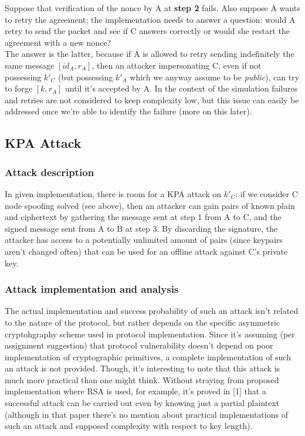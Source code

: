 \documentclass[a4paper,12pt,titlepage]{article}
\begin{document}
Suppose that verification of the nonce by A at \textbf{step 2} fails. Also
suppose A wants to retry the agreement; the implementation needs to answer a
question: would A retry to send the packet and see if C answers correctly or
would she restart the agreement with a new nonce? \\
The answer is the latter, because if A is allowed to retry sending indefinitely
the same message $[id_A, r_A]$, then an attacker impersonating C, even if not
possessing $k'_C$ (but possessing $k'_A$ which we anyway assume to be
\emph{public}), can try to forge $[k, r_A]$ until it's accepted by A.
In the context of the simulation failures and retries are not considered to
keep complexity low, but this issue can easily be addressed once we're able to
identify the failure (more on this later).

\subsection{KPA Attack}
\subsubsection*{Attack description}
In given implementation, there is room for a KPA attack on $k'_C$: if we
consider C node spoofing solved (see above), then an attacker can
gain pairs of known plain and ciphertext by gathering the message sent at step
1 from A to C, and the signed message sent from A to B at step 3. By discarding
the signature, the attacker has access to a potentially unlimited amount of
pairs (since keypairs aren't changed often) that can be used for an offline
attack against C's private key.

\subsubsection*{Attack implementation and analysis}
The actual implementation and success probability of such an attack isn't
related to the nature of the protocol, but rather depends on the specific
asymmetric cryptohgraphy scheme used in protocol implementation. Since it's
assuming (per assignment suggestion) that protocol vulnerability doesn't 
depend on poor implementation of cryptographic primitives, a complete
implementation of such an attack is not provided. Though, it's interesting to
note that this attack is much more practical than one might think. Without
straying from proposed implementation where RSA is used, for example, it's
proved in [1] that a successful attack can be carried out even by knowing just
a partial plaintext (although in that paper there's no mention about practical
implementations of such an attack and supposed complexity with respect to key
length).
\end{document}
